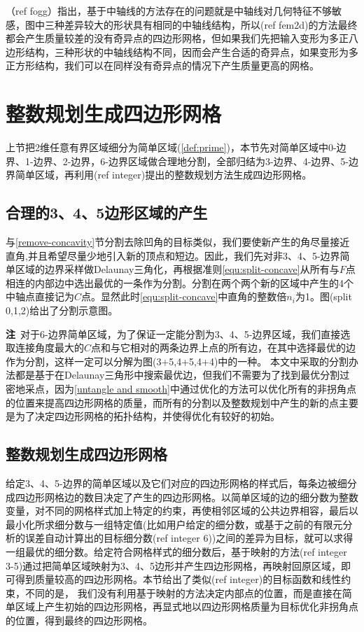 （ref fogg）指出，基于中轴线的方法存在的问题就是中轴线对几何特征不够敏感，图中三种差异较大的形状具有相同的中轴线结构，所以(ref fem2d)的方法最终都会产生质量较差的没有奇异点的四边形网格，但如果我们先把输入变形为多正八边形结构，三种形状的中轴线结构不同，因而会产生合适的奇异点，如果变形为多正方形结构，我们可以在同样没有奇异点的情况下产生质量更高的网格。
 
\section{整数规划生成四边形网格}\label{sec:prime_meshing}
上节把2维任意有界区域细分为简单区域(\ref{def:prime})，本节先对简单区域中0-边界、1-边界、2-边界，6-边界区域做合理地分割，全部归结为3-边界、4-边界、5-边界简单区域，再利用(ref integer)提出的整数规划方法生成四边形网格。
\subsection{合理的3、4、5边形区域的产生}\label{sec:split-C-F}
与\ref{remove-concavity}节分割去除凹角的目标类似，我们要使新产生的角尽量接近直角,并且希望尽量少地引入新的顶点和短边。因此，我们先对非3、4、5-边界简单区域的边界采样做Delaunay三角化，再根据准则\ref{equ:split-concave}从所有与$F$点相连的内部边中选出最优的一条作为分割。分割在两个两个新的区域中产生的4个中轴点直接记为$C$点。显然此时\ref{equ:split-concave}中直角的整数倍$n_i$为1。图(split 0,1,2)给出了分割示意图。

\textbf{注}\, 对于6-边界简单区域，为了保证一定能分割为3、4、5-边界区域，我们直接选取连接角度最大的$C$点和与它相对的两条边界上点的所有边，在其中选择最优的边作为分割，这样一定可以分解为图(3+5,4+5,4+4)中的一种。
本文中采取的分割办法都是基于在Delaunay三角形中搜索最优边，但我们不需要为了找到最优分割过密地采点，因为\ref{untangle and smooth}中通过优化的方法可以优化所有的非拐角点的位置来提高四边形网格的质量，而所有的分割以及整数规划中产生的新的点主要是为了决定四边形网格的拓扑结构，并使得优化有较好的初始。
\subsection{整数规划生成四边形网格}\label{sec:quad-meshing}
给定3、4、5-边界的简单区域以及它们对应的四边形网格的样式后，每条边被细分成四边形网格边的数目决定了产生的四边形网格。以简单区域的边的细分数为整数变量，对不同的网格样式加上特定的约束，再使相邻区域的公共边界相容，最后以最小化所求细分数与一组特定值(比如用户给定的细分数，或基于之前的有限元分析的误差自动计算出的目标细分数(ref integer 6))之间的差异为目标，就可以求得一组最优的细分数。给定符合网格样式的细分数后，基于映射的方法(ref integer 3-5)通过把简单区域映射为3、4、5边形并产生四边形网格，再映射回原区域，即可得到质量较高的四边形网格。本节给出了类似(ref integer)的目标函数和线性约束，不同的是，
我们没有利用基于映射的方法决定内部点的位置，而是直接在简单区域上产生初始的四边形网格，再显式地以四边形网格质量为目标优化非拐角点的位置，得到最终的四边形网格。

